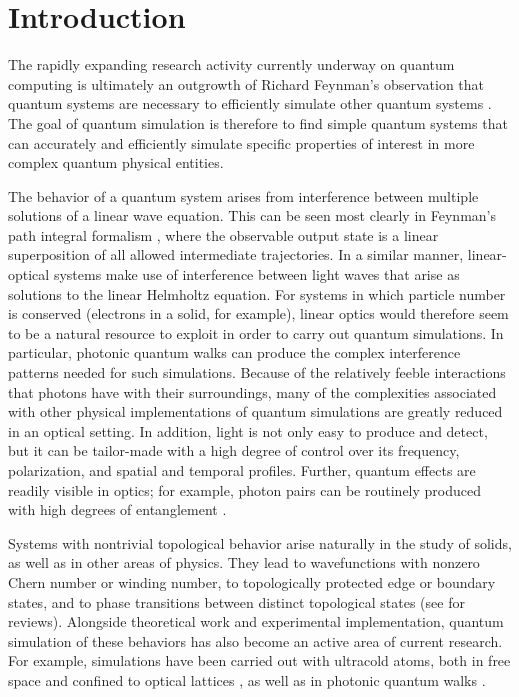 \documentclass[twocolumn,amsmath, amssymb, superscriptaddress, pra]{revtex4}
\begin{document}
\section{Introduction}

The rapidly expanding research activity currently underway on quantum computing \cite{nielsen,kitaev,jaeger,falci}  is ultimately an outgrowth of Richard
Feynman's observation that quantum systems are necessary to efficiently simulate other quantum systems \cite{feyn,aspuru,johnson}. The goal of quantum simulation
is therefore to find simple quantum systems that can accurately and efficiently simulate specific properties of interest in more complex quantum physical
entities.

The behavior of a quantum system arises from interference between multiple
solutions of a linear wave equation. This can be seen most clearly in
Feynman's path integral formalism \cite{path1,path2}, where the observable
output state is a linear superposition of all allowed intermediate
trajectories. In a similar manner, linear-optical systems make use of
interference between light waves that arise as solutions to the linear
Helmholtz equation. For systems in which particle number is conserved
(electrons in a solid, for example), linear optics would therefore seem to be
a natural resource to exploit in order to carry out quantum simulations. In
particular, photonic quantum walks \cite{kempe,ven} can produce the complex
interference patterns needed for such simulations. Because of the relatively
feeble interactions that photons have with their surroundings, many of the
complexities associated with other physical implementations of quantum
simulations are greatly reduced in an optical setting. In addition, light is
not only easy to produce and detect, but it can be tailor-made with a high
degree of control over its frequency, polarization, and spatial and temporal
profiles. Further, quantum effects are readily visible in optics; for
example, photon pairs can be routinely produced with high degrees of
entanglement \cite{shih,ou,simbook}.

Systems with nontrivial topological behavior arise naturally in the study of solids, as well as in other areas of physics. They lead to wavefunctions with
nonzero Chern number or winding number, to topologically protected edge or boundary states, and to phase transitions between distinct topological states (see
\cite{hasan,kitagawa,asboth,bern,stanescu} for reviews). Alongside theoretical work and experimental implementation, quantum simulation of these behaviors has
also become an active area of current research. For example, simulations have been carried out with ultracold atoms, both in free space and confined to optical
lattices \cite{roust1,roust2,liu,li,jav,zhang1,zhang2}, as well as in photonic quantum walks \cite{broome,kitagawa,kit1,kit2,kit3}.
\end{document}

